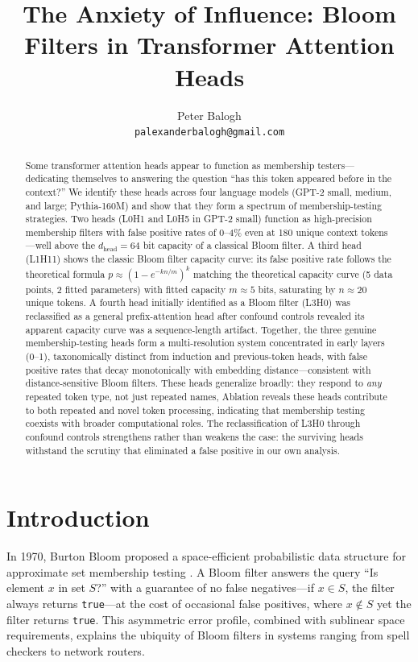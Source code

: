 \documentclass[11pt]{article}
\title{The Anxiety of Influence: Bloom Filters in Transformer Attention Heads}
\author{
  Peter Balogh \\
  \texttt{palexanderbalogh@gmail.com}
}
\begin{document}
\maketitle

\begin{abstract}
Some transformer attention heads appear to function as membership testers---dedicating themselves to answering the question ``has this token appeared before in the context?'' We identify these heads across four language models (GPT-2 small, medium, and large; Pythia-160M) and show that they form a spectrum of membership-testing strategies. Two heads (L0H1 and L0H5 in GPT-2 small) function as high-precision membership filters with false positive rates of 0--4\% even at 180 unique context tokens---well above the $d_\text{head} = 64$ bit capacity of a classical Bloom filter. A third head (L1H11) shows the classic Bloom filter capacity curve: its false positive rate follows the theoretical formula $p \approx (1 - e^{-kn/m})^k$ matching the theoretical capacity curve (5 data points, 2 fitted parameters) with fitted capacity $m \approx 5$ bits, saturating by $n \approx 20$ unique tokens. A fourth head initially identified as a Bloom filter (L3H0) was reclassified as a general prefix-attention head after confound controls revealed its apparent capacity curve was a sequence-length artifact. Together, the three genuine membership-testing heads form a multi-resolution system concentrated in early layers (0--1), taxonomically distinct from induction and previous-token heads, with false positive rates that decay monotonically with embedding distance---consistent with distance-sensitive Bloom filters. These heads generalize broadly: they respond to \emph{any} repeated token type, not just repeated names, Ablation reveals these heads contribute to both repeated and novel token processing, indicating that membership testing coexists with broader computational roles. The reclassification of L3H0 through confound controls strengthens rather than weakens the case: the surviving heads withstand the scrutiny that eliminated a false positive in our own analysis.
\end{abstract}

\section{Introduction}

In 1970, Burton Bloom proposed a space-efficient probabilistic data structure for approximate set membership testing \citep{bloom1970space}. A Bloom filter answers the query ``Is element $x$ in set $S$?'' with a guarantee of no false negatives---if $x \in S$, the filter always returns \texttt{true}---at the cost of occasional false positives, where $x \notin S$ yet the filter returns \texttt{true}. This asymmetric error profile, combined with sublinear space requirements, explains the ubiquity of Bloom filters in systems ranging from spell checkers to network routers.
\end{document}
